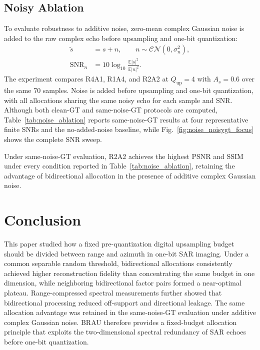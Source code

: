 \documentclass[conference]{IEEEtran}
\begin{document}
\subsection{Noisy Ablation}

To evaluate robustness to additive noise, zero-mean complex Gaussian noise is added to the raw complex echo before upsampling and one-bit quantization:
\begin{equation}
    \begin{aligned}
        \widetilde{s} &= s+n,\qquad n\sim\mathcal{CN}(0,\sigma_n^2), \\
        \mathrm{SNR}_{n} &= 10\log_{10}\frac{\mathbb{E}|s|^2}{\mathbb{E}|n|^2}.
    \end{aligned}
\end{equation}
The experiment compares R4A1, R1A4, and R2A2 at $Q_{\mathrm{up}}=4$ with $A_s=0.6$ over the same 70 samples. Noise is added before upsampling and one-bit quantization, with all allocations sharing the same noisy echo for each sample and SNR. Although both clean-GT and same-noise-GT protocols are computed, Table~\ref{tab:noise_ablation} reports same-noise-GT results at four representative finite SNRs and the no-added-noise baseline, while Fig.~\ref{fig:noise_noisygt_focus} shows the complete SNR sweep.

Under same-noise-GT evaluation, R2A2 achieves the highest PSNR and SSIM under every condition reported in Table~\ref{tab:noise_ablation}, retaining the advantage of bidirectional allocation in the presence of additive complex Gaussian noise.

\section{Conclusion}

This paper studied how a fixed pre-quantization digital upsampling budget should be divided between range and azimuth in one-bit SAR imaging. Under a common separable random threshold, bidirectional allocations consistently achieved higher reconstruction fidelity than concentrating the same budget in one dimension, while neighboring bidirectional factor pairs formed a near-optimal plateau. Range-compressed spectral measurements further showed that bidirectional processing reduced off-support and directional leakage. The same allocation advantage was retained in the same-noise-GT evaluation under additive complex Gaussian noise. BRAU therefore provides a fixed-budget allocation principle that exploits the two-dimensional spectral redundancy of SAR echoes before one-bit quantization.
\end{document}
